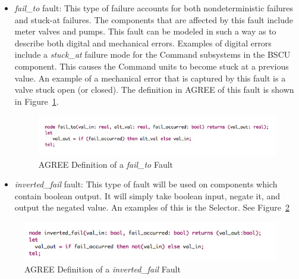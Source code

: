 \begin{itemize}
\item \textit{fail\_to} fault: This type of failure accounts for both nondeterministic failures and stuck-at failures. The components that are affected by this fault include meter valves and pumps. This fault can be modeled in such a way as to describe both digital and mechanical errors. Examples of digital errors include a \textit{stuck\_at} failure mode for the Command subsystems in the BSCU component. This causes the Command units to become stuck at a previous value. An example of a mechanical error that is captured by this fault is a valve stuck open (or closed). The definition in AGREE of this fault is shown in Figure~\ref{fig:fail_to_node}.\\

\begin{figure}[h!]
  \centering
 \includegraphics[width=1\textwidth]{images/fail_to.png}
  \vspace{-0.1in}
  \caption{AGREE Definition of a \textit{fail\_to} Fault}
  \label{fig:fail_to_node}
\end{figure}


\item \textit{inverted\_fail} fault: This type of fault will be used on components which contain boolean output. It will simply take boolean input, negate it, and output the negated value. An examples of this is the Selector. See Figure~\ref{fig:inverted_fail_node}

\end{itemize}

\begin{figure}[h!]
  \centering
 \includegraphics[width=1\textwidth]{images/inverted_fail.png}
  \vspace{-0.1in}
  \caption{AGREE Definition of a \textit{inverted\_fail} Fault}
  \label{fig:inverted_fail_node}
\end{figure}

